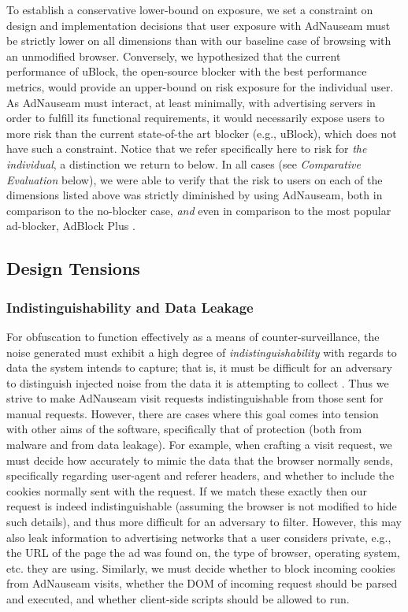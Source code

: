 \documentclass[conference]{IEEEtran}
\begin{document}
To establish a conservative lower-bound on exposure, we set a constraint on design and implementation decisions that user exposure with AdNauseam must be strictly lower on all dimensions than with our baseline case of browsing with an unmodified browser. Conversely, we hypothesized that the current performance of uBlock, the open-source blocker with the best performance metrics, would provide an upper-bound on risk exposure for the individual user. As AdNauseam must interact, at least minimally, with advertising servers in order to fulfill its functional requirements, it would necessarily expose users to more risk than the current state-of-the art blocker (e.g., uBlock), which does not have such a constraint. Notice that we refer specifically here to risk for \emph{the individual}, a distinction we return to below. In all cases (see \emph{Comparative Evaluation} below), we were able to verify that the risk to users on each of the dimensions listed above was strictly diminished by using AdNauseam, both in comparison to the no-blocker case, \emph{and} even in comparison to the most popular ad-blocker, AdBlock Plus \cite{PageFair}.


\subsection{Design Tensions}

\subsubsection{Indistinguishability and Data Leakage}

For obfuscation to function effectively as a means of counter-surveillance, the noise generated must exhibit a high degree of \emph{indistinguishability} with regards to data the system intends to capture; that is, it must be difficult for an adversary to distinguish injected noise from the data it is attempting to collect \cite{Gervais,Balsa}. Thus we strive to make AdNauseam visit requests indistinguishable from those sent for manual requests. However, there are  cases where this goal comes into tension with other aims of the software, specifically that of protection (both from malware and from data leakage). For example, when crafting a visit request, we must decide how accurately to mimic the data that the browser normally sends, specifically regarding user-agent and referer headers, and whether to include the cookies normally sent with the request. If we match these exactly then our request is indeed indistinguishable (assuming the browser is not modified to hide such details), and thus more difficult for an adversary to filter. However, this may also leak information to advertising networks that a user considers private, e.g., the URL of the page the ad was found on, the type of browser, operating system, etc. they are using. Similarly, we must decide whether to block incoming cookies from AdNauseam visits, whether the DOM of incoming request should be parsed and executed, and whether client-side scripts should be allowed to run.
\end{document}

